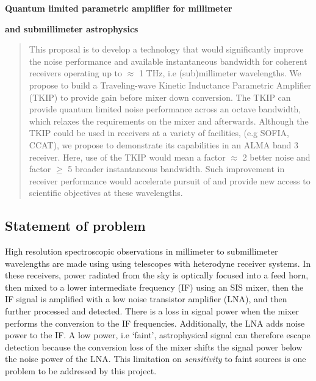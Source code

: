 






\centerline{\textbf{Quantum limited parametric amplifier for millimeter}}
\centerline{\textbf{and submillimeter astrophysics}}
\begin{abstract}
This proposal is to develop a technology that would significantly improve the noise performance and available instantaneous bandwidth for coherent receivers operating up to $\approx$ 1 THz, i.e (sub)millimeter wavelengths. We propose to build a Traveling-wave Kinetic Inductance Parametric Amplifier (TKIP) to provide gain before mixer down conversion. The TKIP can provide quantum limited noise performance across an octave bandwidth, which relaxes the requirements on the mixer and afterwards. Although the TKIP could be used in receivers at a variety of facilities, (e.g SOFIA, CCAT), we propose to demonstrate its capabilities in an ALMA band 3 receiver. Here, use of the TKIP would mean a factor $\approx$ 2 better noise and factor $\ge$ 5 broader instantaneous bandwidth. Such improvement in receiver performance would accelerate pursuit of and provide new access to scientific objectives at these wavelengths.
\end{abstract}

\subsection*{Statement of problem}
High resolution spectroscopic observations in millimeter to submillimeter wavelengths are made using using telescopes with heterodyne receiver systems. In these receivers, power radiated from the sky is optically focused into a feed horn, then mixed to a lower intermediate frequency (IF) using an SIS mixer, then the IF signal is amplified with a low noise transistor amplifier (LNA), and then further processed and detected. There is a loss in signal power when the mixer performs the conversion to the IF frequencies. Additionally, the LNA adds noise power to the IF. A low power, i.e `faint', astrophysical signal can therefore escape detection because the conversion loss of the mixer shifts the signal power below the noise power of the LNA. This limitation on \emph{sensitivity} to faint sources is one problem to be addressed by this project.

